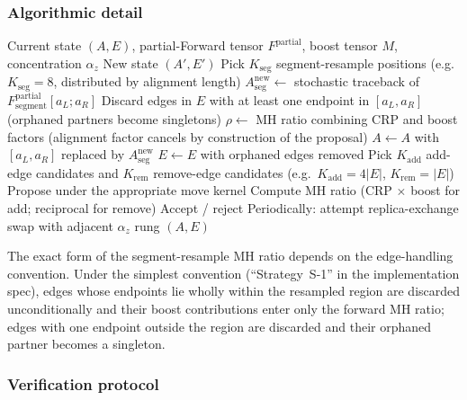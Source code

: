 \subsubsection*{Algorithmic detail}

\begin{algorithm}[H]
\caption{One MCMC sweep on the infinite Pair HMM}
\label{alg:mcmc-sweep}
\begin{algorithmic}[1]
\Require Current state $(A, E)$, partial-Forward tensor
  $F^{\mathrm{partial}}$, boost tensor $M$, concentration
  $\alpha_z$
\Ensure New state $(A', E')$
\State Pick $K_{\mathrm{seg}}$ segment-resample positions
  (e.g.\ $K_{\mathrm{seg}} = 8$, distributed by alignment length)
  \State $A_{\mathrm{seg}}^{\mathrm{new}} \gets$ stochastic
    traceback of $F^{\mathrm{partial}}_{\mathrm{segment}}[a_L; a_R]$
  \State Discard edges in $E$ with at least one endpoint in
    $[a_L, a_R]$ (orphaned partners become singletons)
  \State $\rho \gets$ MH ratio combining CRP and boost factors
    (alignment factor cancels by construction of the proposal)
    \State $A \gets A$ with $[a_L, a_R]$ replaced by
      $A_{\mathrm{seg}}^{\mathrm{new}}$
    \State $E \gets E$ with orphaned edges removed
  \EndIf
\EndFor
\State Pick $K_{\mathrm{add}}$ add-edge candidates and
  $K_{\mathrm{rem}}$ remove-edge candidates (e.g.\
  $K_{\mathrm{add}} = 4 |E|$, $K_{\mathrm{rem}} = |E|$)
  \State Propose under the appropriate move kernel
  \State Compute MH ratio (CRP $\times$ boost for add;
    reciprocal for remove)
  \State Accept / reject
\EndFor
\State Periodically: attempt replica-exchange swap with adjacent
  $\alpha_z$ rung
\State \Return $(A, E)$
\end{algorithmic}
\end{algorithm}

\noindent The exact form of the segment-resample MH ratio depends
on the edge-handling convention. Under the simplest convention
(``Strategy~S-1'' in the implementation spec), edges whose
endpoints lie wholly within the resampled region are discarded
unconditionally and their boost contributions enter only the
forward MH ratio; edges with one endpoint outside the region are
discarded and their orphaned partner becomes a singleton.

\subsubsection*{Verification protocol}
\label{sec:phmm-mcmc-verification}

